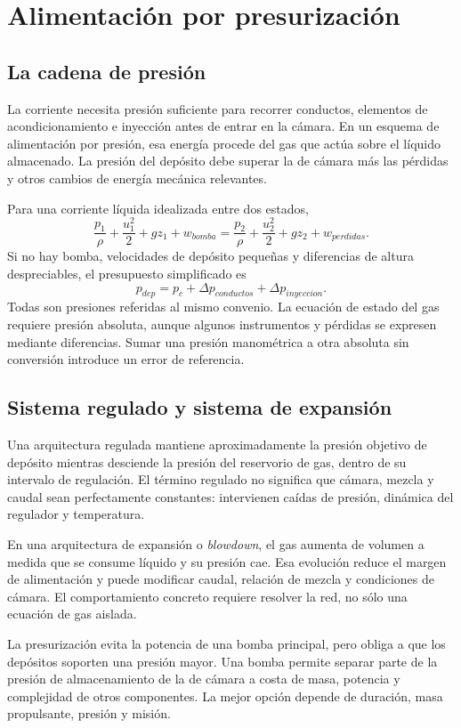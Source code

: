 \chapter{Alimentación por presurización}\label{ch:18}
\section{La cadena de presión}
La corriente necesita presión suficiente para recorrer conductos, elementos de acondicionamiento e inyección antes de entrar en la cámara. En un esquema de alimentación por presión, esa energía procede del gas que actúa sobre el líquido almacenado. La presión del depósito debe superar la de cámara más las pérdidas y otros cambios de energía mecánica relevantes.

Para una corriente líquida idealizada entre dos estados,
\[
 \frac{p_1}{\rho}+\frac{u_1^2}{2}+gz_1+w_{bomba}
 =\frac{p_2}{\rho}+\frac{u_2^2}{2}+gz_2+w_{perdidas}.
\]
Si no hay bomba, velocidades de depósito pequeñas y diferencias de altura despreciables, el presupuesto simplificado es
\[
 p_{dep}=p_c+\Delta p_{conductos}+\Delta p_{inyeccion}.
\]
Todas son presiones referidas al mismo convenio. La ecuación de estado del gas requiere presión absoluta, aunque algunos instrumentos y pérdidas se expresen mediante diferencias. Sumar una presión manométrica a otra absoluta sin conversión introduce un error de referencia.
\section{Sistema regulado y sistema de expansión}
Una arquitectura regulada mantiene aproximadamente la presión objetivo de depósito mientras desciende la presión del reservorio de gas, dentro de su intervalo de regulación. El término regulado no significa que cámara, mezcla y caudal sean perfectamente constantes: intervienen caídas de presión, dinámica del regulador y temperatura.

En una arquitectura de expansión o \emph{blowdown}, el gas aumenta de volumen a medida que se consume líquido y su presión cae. Esa evolución reduce el margen de alimentación y puede modificar caudal, relación de mezcla y condiciones de cámara. El comportamiento concreto requiere resolver la red, no sólo una ecuación de gas aislada.\cite{MIT24}

La presurización evita la potencia de una bomba principal, pero obliga a que los depósitos soporten una presión mayor. Una bomba permite separar parte de la presión de almacenamiento de la de cámara a costa de masa, potencia y complejidad de otros componentes. La mejor opción depende de duración, masa propulsante, presión y misión.
